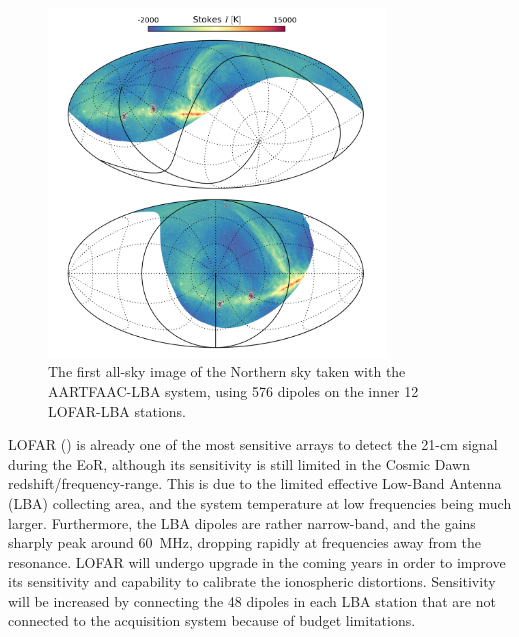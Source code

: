 \begin{figure}[t]
\begin{center}
\includegraphics[width=0.8\textwidth]{Koopmans_Bernardi/AARTFAAC=LBA-12-all-sky.png}
\end{center}
\caption{The first all-sky image of the Northern sky taken with the AARTFAAC-LBA system, using 576 dipoles on the inner 12 LOFAR-LBA stations.}
\label{fig:fig_AARTFAAC}
\end{figure}
%
LOFAR (\cite{vanhaarlem13}) is already one of the most sensitive arrays to detect the 21-cm signal during the EoR, although its sensitivity is still limited in the Cosmic Dawn redshift/frequency-range. This is due to the limited effective Low-Band Antenna (LBA) collecting area, and the system temperature at low frequencies being much larger. Furthermore, the LBA dipoles are rather narrow-band, and the gains sharply peak around 60~MHz, dropping rapidly at frequencies away from the resonance. 
LOFAR will undergo upgrade in the coming years in order to improve its sensitivity and capability to calibrate the ionospheric distortions. Sensitivity will be increased by connecting the 48 dipoles in each LBA station that are not connected to the acquisition system because of budget limitations.

